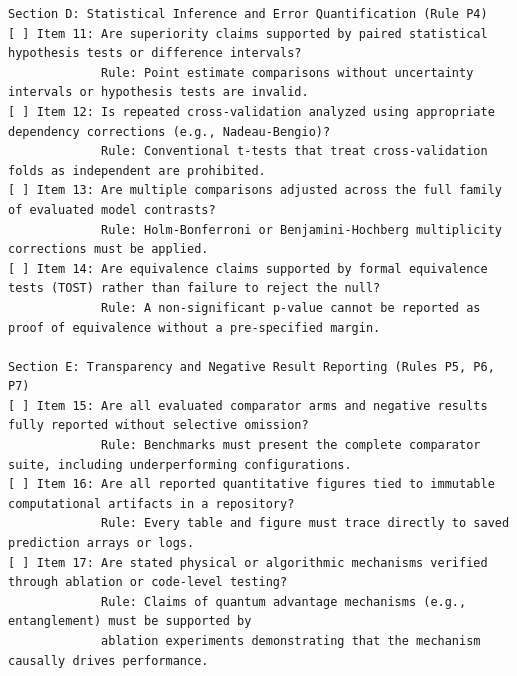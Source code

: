 \documentclass[10pt,a4paper]{article}
\begin{document}
\begin{lstlisting}
Section D: Statistical Inference and Error Quantification (Rule P4)
[ ] Item 11: Are superiority claims supported by paired statistical hypothesis tests or difference intervals?
             Rule: Point estimate comparisons without uncertainty intervals or hypothesis tests are invalid.
[ ] Item 12: Is repeated cross-validation analyzed using appropriate dependency corrections (e.g., Nadeau-Bengio)?
             Rule: Conventional t-tests that treat cross-validation folds as independent are prohibited.
[ ] Item 13: Are multiple comparisons adjusted across the full family of evaluated model contrasts?
             Rule: Holm-Bonferroni or Benjamini-Hochberg multiplicity corrections must be applied.
[ ] Item 14: Are equivalence claims supported by formal equivalence tests (TOST) rather than failure to reject the null?
             Rule: A non-significant p-value cannot be reported as proof of equivalence without a pre-specified margin.

Section E: Transparency and Negative Result Reporting (Rules P5, P6, P7)
[ ] Item 15: Are all evaluated comparator arms and negative results fully reported without selective omission?
             Rule: Benchmarks must present the complete comparator suite, including underperforming configurations.
[ ] Item 16: Are all reported quantitative figures tied to immutable computational artifacts in a repository?
             Rule: Every table and figure must trace directly to saved prediction arrays or logs.
[ ] Item 17: Are stated physical or algorithmic mechanisms verified through ablation or code-level testing?
             Rule: Claims of quantum advantage mechanisms (e.g., entanglement) must be supported by 
             ablation experiments demonstrating that the mechanism causally drives performance.
\end{lstlisting}
\end{document}
